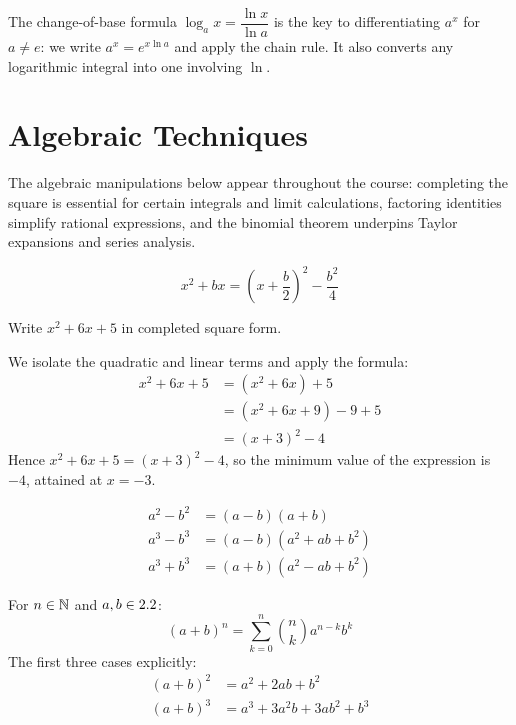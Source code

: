 \begin{remark}
The change-of-base formula $\log_a x = \dfrac{\ln x}{\ln a}$ is the key
to differentiating $a^x$ for $a \neq e$: we write $a^x = e^{x \ln a}$
and apply the chain rule. It also converts any logarithmic integral into
one involving $\ln$.
\end{remark}

\section{Algebraic Techniques}
\label{sec:A.3}

The algebraic manipulations below appear throughout the course: completing
the square is essential for certain integrals and limit calculations,
factoring identities simplify rational expressions, and the binomial
theorem underpins Taylor expansions and series analysis.

\begin{proposition}\label{prop:A-10}
\[
  x^2 + bx = \left(x + \dfrac{b}{2}\right)^2 - \dfrac{b^2}{4}
\]
\end{proposition}

\begin{example}\label{ex:A-1}
Write $x^2 + 6x + 5$ in completed square form.

We isolate the quadratic and linear terms and apply the formula:
\begin{align*}
  x^2 + 6x + 5
    &= (x^2 + 6x) + 5 \\
    &= \left(x^2 + 6x + 9\right) - 9 + 5 \\
    &= (x + 3)^2 - 4
\end{align*}
Hence $x^2 + 6x + 5 = (x+3)^2 - 4$, so the minimum value of the
expression is $-4$, attained at $x = -3$.
\end{example}

\begin{proposition}\label{prop:A-11}
\begin{align*}
  a^2 - b^2 &= (a-b)(a+b) \\
  a^3 - b^3 &= (a-b)(a^2+ab+b^2) \\
  a^3 + b^3 &= (a+b)(a^2-ab+b^2)
\end{align*}
\end{proposition}

\begin{proposition}\label{prop:A-12}
For $n \in \mathbb{N}$ and $a, b \in 2.2$:
\[
  (a+b)^n = \sum_{k=0}^{n} \binom{n}{k} a^{n-k} b^k
\]
The first three cases explicitly:
\begin{align*}
  (a+b)^2 &= a^2 + 2ab + b^2 \\
  (a+b)^3 &= a^3 + 3a^2 b + 3ab^2 + b^3
\end{align*}
\end{proposition}


